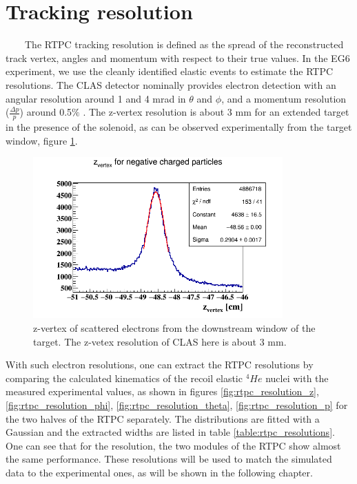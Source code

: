 \section{Tracking resolution}
~~~~The RTPC tracking resolution is defined as the spread of the reconstructed 
track vertex, angles and momentum with respect to their true values. In the EG6 
experiment, we use the cleanly identified elastic events to estimate the RTPC 
resolutions. The CLAS detector nominally provides electron detection with an 
angular resolution around 1 and 4 mrad in $\theta$ and $\phi$, and a momentum 
resolution ($\frac{\Delta p}{p}$) around 0.5$\%$ \cite{CLASref}. The z-vertex 
resolution is about 3 mm for an extended target in the presence of the 
solenoid, as can be observed experimentally from the target window, figure 
\ref{fig:electron_z_vertex_res}. \\
\begin{figure}[tbp]
   \centering
   \includegraphics[height=6.2cm]{fig_rtpc/clas_z_resolution.png}
   \caption{ z-vertex of scattered electrons from the downstream window of the 
   target. The z-vetex resolution of CLAS here is about 3 mm.}
   \label{fig:electron_z_vertex_res}
\end{figure}

With such electron resolutions, one can extract the RTPC resolutions by 
comparing the calculated kinematics of the recoil elastic $^4He$ nuclei  with 
the measured experimental values, as shown in figures 
\ref{fig:rtpc_resolution_z}, \ref{fig:rtpc_resolution_phi}, 
\ref{fig:rtpc_resolution_theta}, \ref{fig:rtpc_resolution_p} for the two halves 
of the RTPC separately. The distributions are fitted with a Gaussian and the 
extracted widths are listed in table \ref{table:rtpc_resolutions}.  One can see 
that for the resolution, the two modules of the RTPC show almost the same 
performance. These resolutions will be used to match the simulated data to the 
experimental ones, as will be shown in the following chapter.\\

